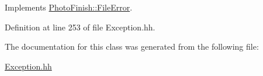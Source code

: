 Implements \hyperlink{class_photo_finish_1_1_file_error_ac4da80387c770aa95858dae8aac9a81e}{Photo\+Finish\+::\+File\+Error}.



Definition at line 253 of file Exception.\+hh.



The documentation for this class was generated from the following file\+:\begin{DoxyCompactItemize}
\item 
\hyperlink{_exception_8hh}{Exception.\+hh}\end{DoxyCompactItemize}
